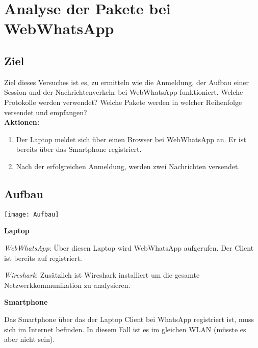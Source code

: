\section{Analyse der Pakete bei WebWhatsApp}\label{sec:kaptiel}
\subsection{Ziel}
Ziel dieses Versuches ist es, zu ermitteln wie die Anmeldung, der Aufbau einer Session 
und der Nachrichtenverkehr bei WebWhatsApp funktioniert. Welche Protokolle werden
verwendet? Welche Pakete werden in welcher Reihenfolge versendet und empfangen?\\
\textbf{Aktionen:}
\begin{enumerate}
    \item Der Laptop meldet sich über einen Browser bei WebWhatsApp an. Er ist bereits über das Smartphone registriert.
    \item Nach der erfolgreichen Anmeldung, werden zwei Nachrichten versendet.
\end{enumerate}

\subsection{Aufbau}
\begin{center}
    \texttt{[image: Aufbau]}
\end{center}

\begin{description}
    \item \textbf{Laptop}
        \begin{description}
            \item \textit{WebWhatsApp}: 
                Über diesen Laptop wird WebWhatsApp aufgerufen. Der Client ist 
                bereits auf registriert. 
            \item \textit{Wireshark}:
                Zusätzlich ist Wireshark installiert um die gesamte Netzwerkkommunikation
                zu analysieren.
        \end{description}
    \item \textbf{Smartphone}
    \begin{description}
       \item Das Smartphone über das der Laptop Client bei WhatsApp registriert ist, muss
            sich im Internet befinden. In diesem Fall ist es im gleichen WLAN (müsste es aber nicht sein). 
    \end{description}
\end{description}

